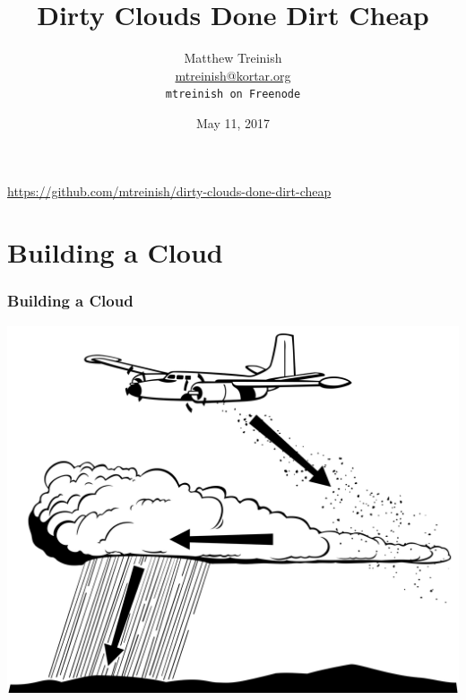 \documentclass[aspectratio=169,11pt,hyperref={colorlinks=true}]{beamer}
\author[Matthew Treinish]{%
    \texorpdfstring{%
        \centering
        Matthew Treinish\\
        \href{mailto:mtreinish@kortar.org}{mtreinish@kortar.org}\\
        \texttt{mtreinish on Freenode}
   }
   {Matthew Treinish}
}
\date{May 11, 2017}
\title[Dirty Clouds Done Dirt Cheap
\hspace{2em}\insertframenumber/\inserttotalframenumber]{Dirty Clouds Done Dirt Cheap}
\begin{document}
{%
\begin{frame}[noframenumbering]
    \hypersetup{colorlinks,urlcolor=white}
    \titlepage{}
    \centering
    \href{https://github.com/mtreinish/dirty-clouds-done-dirt-cheap}{https://github.com/mtreinish/dirty-clouds-done-dirt-cheap}
\end{frame}
}

\section{Building a Cloud}
\begin{frame}
\frametitle{Building a Cloud}
\centering
\includegraphics[width=.775\textwidth]{cloud_seeding.png}
\end{frame}
\end{document}
